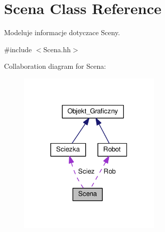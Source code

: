 \hypertarget{class_scena}{\section{Scena Class Reference}
\label{class_scena}
}


Modeluje informacje dotyczace Sceny.  




{\ttfamily \#include $<$Scena.\+hh$>$}



Collaboration diagram for Scena\+:\nopagebreak
\begin{figure}[H]
\begin{center}
\leavevmode
\includegraphics[width=194pt]{class_scena__coll__graph}
\end{center}
\end{figure}
